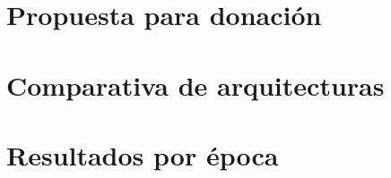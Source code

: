 \documentclass[12pt,oneside,letterpaper]{book}
\begin{document}
\chapter{Propuesta para donación}\label{appendix:grant}


\chapter{Comparativa de arquitecturas}\label{appendix:comparativa}


\chapter{Resultados por época}\label{appendix:entrenamiento}

\printbibliography{}
\end{document}
